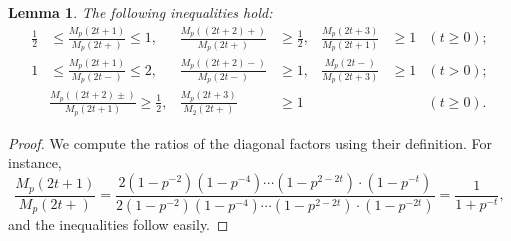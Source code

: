 \documentclass[a4paper]{amsart}
\theoremstyle{definition}
\theoremstyle{plain}
\newtheorem{lemma}[definition]{Lemma}
\begin{document}
\begin{lemma} \label{lem:diag.factors}
    The following inequalities hold:
    \begin{align*}
        \frac 12 &\leq \frac{M_p(2t+1)}{M_p(2t+)} \leq 1,  &  \frac{M_p((2t+2)+)}{M_p(2t+)} & \geq \frac{1}{2}, &  \frac{M_p(2t+3)}{M_p(2t+1)} & \geq 1 & (t\geq 0); \\
         1 & \leq \frac{M_p(2t+1)}{M_p(2t-)} \leq 2, & \frac{M_p((2t+2)-)}{M_p(2t-)} & \geq 1, &
    \frac{M_p(2t-)}{M_p(2t+3)}&\geq 1 &  (t> 0);\\
    &\frac{M_p((2t+2)\pm)}{M_p(2t+1)} \geq \frac{1}{2},& \frac{M_p(2t+3)}{M_2(2t+)} &\geq 1 & &&(t \geq 0).
    \end{align*}
\end{lemma}
\begin{proof}
    We compute the ratios of the diagonal factors using their definition. For instance,
    \[
        \frac{M_p(2t+1)}{M_p(2t+)} = \frac{2(1-p^{-2})(1-p^{-4})\cdots(1-p^{2-2t})\cdot (1 - p^{-t})}{2(1-p^{-2})(1-p^{-4})\cdots(1-p^{2-2t})\cdot (1-p^{-2t})} = \frac{1}{1 + p^{-t}},
    \]
    and the inequalities follow easily.
\end{proof}
\end{document}
